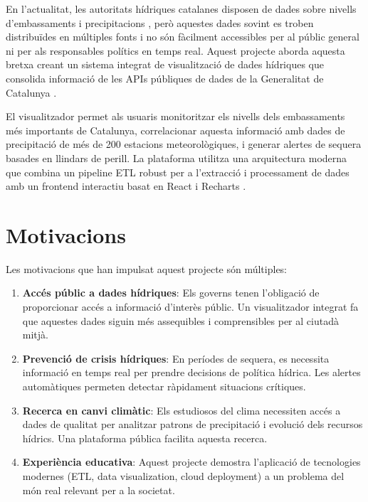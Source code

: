 En l'actualitat, les autoritats hídriques catalanes disposen de dades sobre nivells d'embassaments i precipitacions \cite{aca}, però aquestes dades sovint es troben distribuïdes en múltiples fonts i no són fàcilment accessibles per al públic general ni per als responsables polítics en temps real. Aquest projecte aborda aquesta bretxa creant un sistema integrat de visualització de dades hídriques que consolida informació de les APIs públiques de dades de la Generalitat de Catalunya \cite{gencat_dades}.

El visualitzador permet als usuaris monitoritzar els nivells dels embassaments més importants de Catalunya, correlacionar aquesta informació amb dades de precipitació de més de 200 estacions meteorològiques, i generar alertes de sequera basades en llindars de perill. La plataforma utilitza una arquitectura moderna que combina un pipeline ETL robust per a l'extracció i processament de dades amb un frontend interactiu basat en React \cite{react} i Recharts \cite{recharts}.


\section{Motivacions}

Les motivacions que han impulsat aquest projecte són múltiples:

\begin{enumerate}
    \item \textbf{Accés públic a dades hídriques}: Els governs tenen l'obligació de proporcionar accés a informació d'interès públic. Un visualitzador integrat fa que aquestes dades siguin més assequibles i comprensibles per al ciutadà mitjà.
    
    \item \textbf{Prevenció de crisis hídriques}: En períodes de sequera, es necessita informació en temps real per prendre decisions de política hídrica. Les alertes automàtiques permeten detectar ràpidament situacions crítiques.
    
    \item \textbf{Recerca en canvi climàtic}: Els estudiosos del clima necessiten accés a dades de qualitat per analitzar patrons de precipitació i evolució dels recursos hídrics. Una plataforma pública facilita aquesta recerca.
    
    \item \textbf{Experiència educativa}: Aquest projecte demostra l'aplicació de tecnologies modernes (ETL, data visualization, cloud deployment) a un problema del món real relevant per a la societat.
\end{enumerate}

